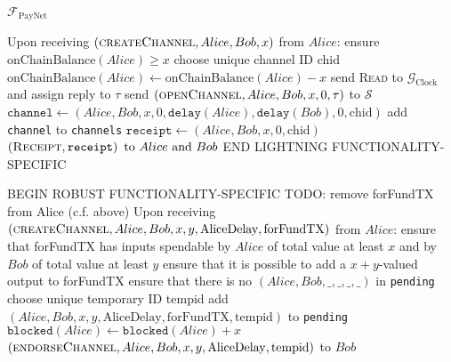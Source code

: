 \begin{functionality}{$\mathcal{F}_{\mathrm{PayNet}}$}
\begin{algorithmic}[1]
    \State Upon receiving $\left(\textsc{createChannel}, Alice, Bob, x\right)$
    from $Alice$:
    \Indent
      \State ensure $\mathrm{onChainBalance}\left(Alice\right) \geq x$
      \State choose unique channel ID chid
      \State $\mathrm{onChainBalance}\left(Alice\right) \gets
      \mathrm{onChainBalance}\left(Alice\right) - x$
      \State send \textsc{Read} to $\mathcal{G}_{\mathrm{Clock}}$ and assign
      reply to $\tau$
      \State send $\left(\textsc{openChannel}, Alice, Bob, x, 0, \tau\right)$ to
      $\mathcal{S}$ 
      \State $\mathtt{channel} \gets \left(Alice, Bob, x, 0,
      \mathtt{delay}\left(Alice\right), \mathtt{delay}\left(Bob\right), 0,
      \mathrm{chid}\right)$
      \State add \texttt{channel} to \texttt{channels}
      \State $\mathtt{receipt} \gets \left(Alice, Bob, x, 0,
      \mathrm{chid}\right)$
      \State \Return $\left(\textsc{Receipt}, \mathtt{receipt}\right) \text{
      to } Alice \text{ and } Bob$
    \EndIndent
    \State END LIGHTNING FUNCTIONALITY-SPECIFIC
    \State

    \State BEGIN ROBUST FUNCTIONALITY-SPECIFIC
    \State TODO: remove forFundTX from Alice (c.f. above)
    \State Upon receiving $\left(\textsc{createChannel}, Alice, Bob, x, y,
    \mathrm{AliceDelay}, \mathrm{forFundTX}\right)$ from $Alice$:
    \Indent
      \State ensure that forFundTX has inputs spendable by $Alice$ of total
      value at least $x$ and by $Bob$ of total value at least $y$
      \State ensure that it is possible to add a $x + y$-valued output to
      forFundTX
      \State ensure that there is no $\left(Alice, Bob, \_, \_, \_, \_\right)$
      in \texttt{pending}
      \State choose unique temporary ID tempid
      \State add $\left(Alice, Bob, x, y, \mathrm{AliceDelay},
      \mathrm{forFundTX}, \mathrm{tempid}\right)$ to \texttt{pending}
      \State $\mathtt{blocked}\left(Alice\right) \leftarrow
      \mathtt{blocked}\left(Alice\right) + x$
      \State \Return $\left(\textsc{endorseChannel}, Alice, Bob, x, y,
      \mathrm{AliceDelay}, \mathrm{tempid}\right)$ to $Bob$ 
    \EndIndent
    \State


\end{algorithmic}
\end{functionality}
